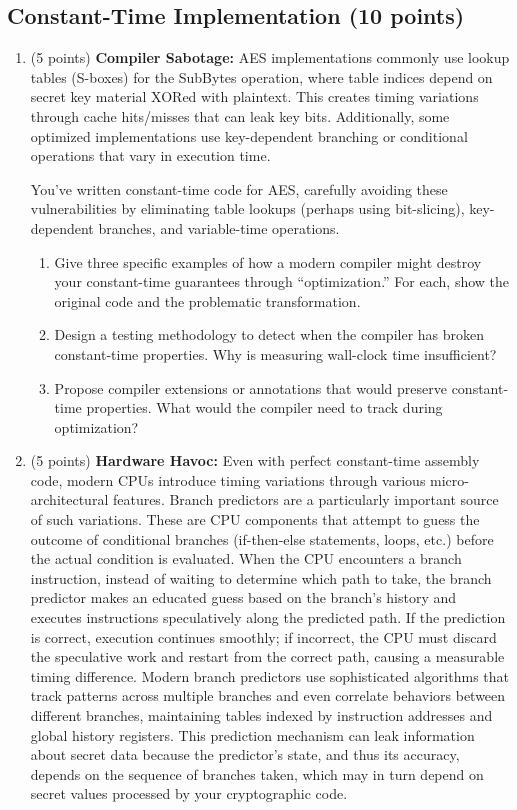\documentclass[10pt,a4paper,american]{article}
\begin{document}
\subsection{Constant-Time Implementation (10 points)}

\begin{enumerate}
	\item (5 points) \textbf{Compiler Sabotage:}
	      AES implementations commonly use lookup tables (S-boxes) for the SubBytes operation, where table indices depend on secret key material XORed with plaintext. This creates timing variations through cache hits/misses that can leak key bits. Additionally, some optimized implementations use key-dependent branching or conditional operations that vary in execution time.

	      You've written constant-time code for AES, carefully avoiding these vulnerabilities by eliminating table lookups (perhaps using bit-slicing), key-dependent branches, and variable-time operations.
	      \begin{enumerate}
		      \item Give three specific examples of how a modern compiler might destroy your constant-time guarantees through ``optimization.'' For each, show the original code and the problematic transformation.
		      \item Design a testing methodology to detect when the compiler has broken constant-time properties. Why is measuring wall-clock time insufficient?
		      \item Propose compiler extensions or annotations that would preserve constant-time properties. What would the compiler need to track during optimization?
	      \end{enumerate}
	\item (5 points) \textbf{Hardware Havoc:}
	      Even with perfect constant-time assembly code, modern CPUs introduce timing variations through various micro-architectural features. Branch predictors are a particularly important source of such variations. These are CPU components that attempt to guess the outcome of conditional branches (if-then-else statements, loops, etc.) before the actual condition is evaluated. When the CPU encounters a branch instruction, instead of waiting to determine which path to take, the branch predictor makes an educated guess based on the branch's history and executes instructions speculatively along the predicted path. If the prediction is correct, execution continues smoothly; if incorrect, the CPU must discard the speculative work and restart from the correct path, causing a measurable timing difference. Modern branch predictors use sophisticated algorithms that track patterns across multiple branches and even correlate behaviors between different branches, maintaining tables indexed by instruction addresses and global history registers. This prediction mechanism can leak information about secret data because the predictor's state, and thus its accuracy, depends on the sequence of branches taken, which may in turn depend on secret values processed by your cryptographic code.

\end{enumerate}
\end{document}
